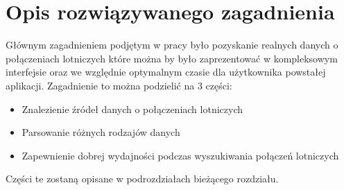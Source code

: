 \documentclass[12pt, twoside]{report}
\begin{document}
\newpage
\chapter{Opis rozwiązywanego zagadnienia}
Głównym zagadnieniem podjętym w pracy było  pozyskanie realnych danych o połączeniach lotniczych które można by było zaprezentować w kompleksowym interfejsie oraz we względnie optymalnym czasie dla użytkownika powstałej aplikacji.
Zagadnienie to można podzielić na 3 części:
\begin{itemize}[noitemsep,topsep=0pt]
\item Znalezienie źródeł danych o połączeniach lotniczych
\item Parsowanie różnych rodzajów danych
\item Zapewnienie dobrej wydajności podczas wyszukiwania połączeń lotniczych
\end{itemize}
Części te zostaną opisane w podrozdziałach bieżącego rozdziału.
\end{document}
